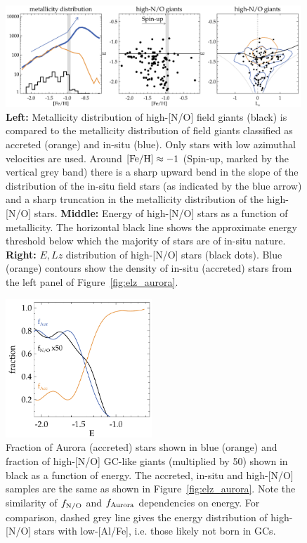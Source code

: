 \documentclass[a4paper,useAMS,usenatbib]{mnras}
\begin{document}
%
\begin{figure}
  \centering
  \includegraphics[width=0.99\textwidth]{img/no_feh_elz.pdf}
  \caption[]{{\bf Left:} Metallicity distribution of high-[N/O] field giants (black) is compared to the metallicity distribution of field giants classified as accreted (orange) and in-situ (blue). Only stars with low azimuthal velocities are used. Around $\rm [Fe/H]\approx-1$ (Spin-up, marked by the vertical grey band) there is a sharp upward bend in the slope of the distribution of the in-situ field stars (as indicated by the blue arrow) and a sharp truncation in the metallicity distribution of the high-[N/O] stars. {\bf Middle:} Energy of high-[N/O] stars as a function of metallicity. The horizontal black line shows the approximate energy threshold below which the majority of stars are of in-situ nature. {\bf Right:} $E, Lz$ distribution of high-[N/O] stars (black dots). Blue (orange) contours show the density of in-situ (accreted) stars from the left panel of Figure~\ref{fig:elz_aurora}.}
   \label{fig:no_feh_elz}
\end{figure}
%

%
\begin{figure}
  \centering
  \includegraphics[width=0.49\textwidth]{img/frac_energy.pdf}
  \caption[]{Fraction of Aurora (accreted) stars shown in blue (orange) and fraction of high-[N/O] GC-like giants (multiplied by 50) shown in black as a function of energy. The accreted, in-situ and high-[N/O] samples are the same as shown in Figure~\ref{fig:elz_aurora}. Note the similarity of  $f_{\rm N/O}$ and $f_{\rm Aurora}$ dependencies on energy. For comparison, dashed grey line gives the energy distribution of high-[N/O] stars with low-[Al/Fe], i.e. those likely not born in GCs.}
   \label{fig:frac_energy}
\end{figure}
%
\end{document}
